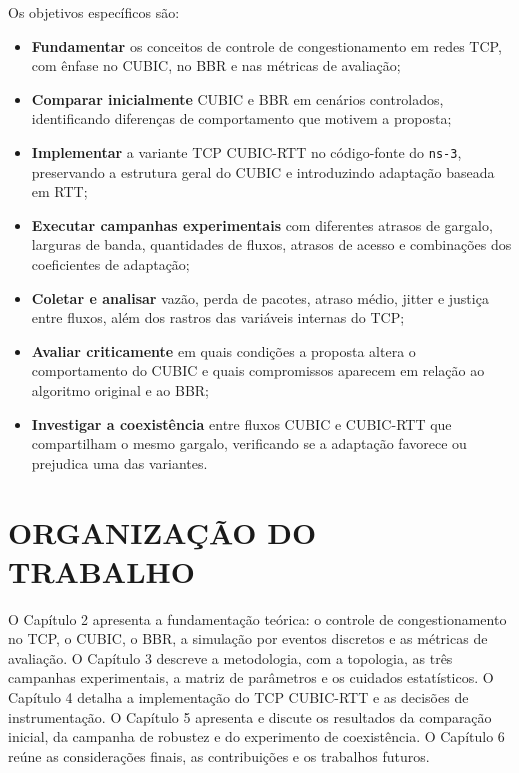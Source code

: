 Os objetivos específicos são:
\begin{itemize}
    \item \textbf{Fundamentar} os conceitos de controle de congestionamento em redes TCP, com ênfase no CUBIC, no BBR e nas métricas de avaliação;
    \item \textbf{Comparar inicialmente} CUBIC e BBR em cenários controlados, identificando diferenças de comportamento que motivem a proposta;
    \item \textbf{Implementar} a variante TCP CUBIC-RTT no código-fonte do \texttt{ns-3}, preservando a estrutura geral do CUBIC e introduzindo adaptação baseada em RTT;
    \item \textbf{Executar campanhas experimentais} com diferentes atrasos de gargalo, larguras de banda, quantidades de fluxos, atrasos de acesso e combinações dos coeficientes de adaptação;
    \item \textbf{Coletar e analisar} vazão, perda de pacotes, atraso médio, jitter e justiça entre fluxos, além dos rastros das variáveis internas do TCP;
    \item \textbf{Avaliar criticamente} em quais condições a proposta altera o comportamento do CUBIC e quais compromissos aparecem em relação ao algoritmo original e ao BBR;
    \item \textbf{Investigar a coexistência} entre fluxos CUBIC e CUBIC-RTT que compartilham o mesmo gargalo, verificando se a adaptação favorece ou prejudica uma das variantes.
\end{itemize}

\section{ORGANIZAÇÃO DO TRABALHO}
O Capítulo 2 apresenta a fundamentação teórica: o controle de congestionamento no TCP, o CUBIC, o BBR, a simulação por eventos discretos e as métricas de avaliação. O Capítulo 3 descreve a metodologia, com a topologia, as três campanhas experimentais, a matriz de parâmetros e os cuidados estatísticos. O Capítulo 4 detalha a implementação do TCP CUBIC-RTT e as decisões de instrumentação. O Capítulo 5 apresenta e discute os resultados da comparação inicial, da campanha de robustez e do experimento de coexistência. O Capítulo 6 reúne as considerações finais, as contribuições e os trabalhos futuros.
